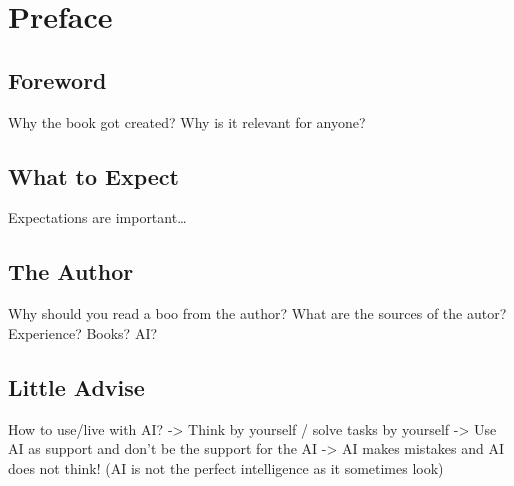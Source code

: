 \chapter{Preface}
\label{cha:preface}



    \section{Foreword}
    \label{sec:foreword}
        Why the book got created? Why is it relevant for anyone? 
        \Blindtext



    \section{What to Expect}
    \label{sec:what-to-expect}
        Expectations are important\dots
        \blindtext


        
    \section{The Author}
    \label{sec:the-author}
        Why should you read a boo from the author? What are the sources of the autor? Experience? Books? AI?
        \blindtext

    

    \section{Little Advise}
    \label{sec:little-advise}
        How to use/live with AI?
        -> Think by yourself / solve tasks by yourself
        -> Use AI as support and don't be the support for the AI
        -> AI makes mistakes and AI does not think! (AI is not the perfect intelligence as it sometimes look)
        \blindtext

    
    
